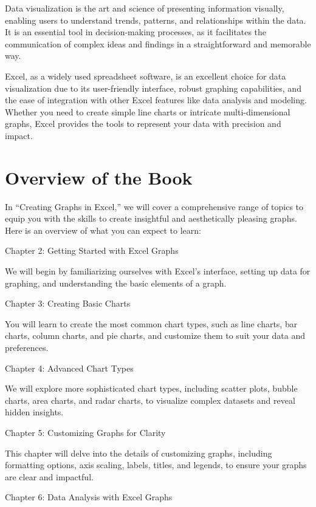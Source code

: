 \documentclass[
]{book}
\begin{document}
Data visualization is the art and science of presenting information visually, enabling users to understand trends, patterns, and relationships within the data. It is an essential tool in decision-making processes, as it facilitates the communication of complex ideas and findings in a straightforward and memorable way.

Excel, as a widely used spreadsheet software, is an excellent choice for data visualization due to its user-friendly interface, robust graphing capabilities, and the ease of integration with other Excel features like data analysis and modeling. Whether you need to create simple line charts or intricate multi-dimensional graphs, Excel provides the tools to represent your data with precision and impact.

\hypertarget{overview-of-the-book}{%
\section{Overview of the Book}\label{overview-of-the-book}}

In ``Creating Graphs in Excel,'' we will cover a comprehensive range of topics to equip you with the skills to create insightful and aesthetically pleasing graphs. Here is an overview of what you can expect to learn:

Chapter 2: Getting Started with Excel Graphs

We will begin by familiarizing ourselves with Excel's interface, setting up data for graphing, and understanding the basic elements of a graph.

Chapter 3: Creating Basic Charts

You will learn to create the most common chart types, such as line charts, bar charts, column charts, and pie charts, and customize them to suit your data and preferences.

Chapter 4: Advanced Chart Types

We will explore more sophisticated chart types, including scatter plots, bubble charts, area charts, and radar charts, to visualize complex datasets and reveal hidden insights.

Chapter 5: Customizing Graphs for Clarity

This chapter will delve into the details of customizing graphs, including formatting options, axis scaling, labels, titles, and legends, to ensure your graphs are clear and impactful.

Chapter 6: Data Analysis with Excel Graphs
\end{document}
